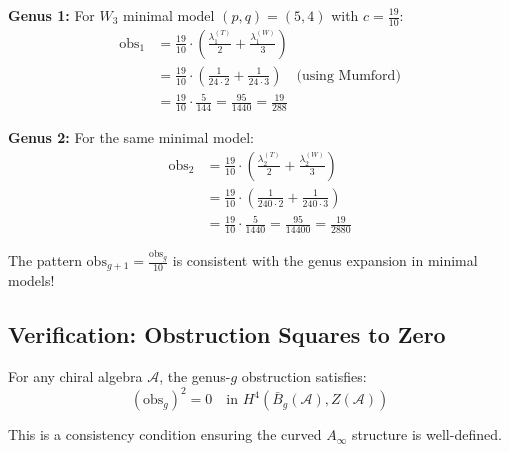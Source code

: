 \begin{computation}\label{comp:w3-obs-explicit}

\textbf{Genus 1:} For $W_3$ minimal model $(p,q) = (5,4)$ with $c = \frac{19}{10}$:
\begin{align}
\text{obs}_1 &= \frac{19}{10} \cdot \left(\frac{\lambda_1^{(T)}}{2} + 
\frac{\lambda_1^{(W)}}{3}\right) \\
&= \frac{19}{10} \cdot \left(\frac{1}{24 \cdot 2} + \frac{1}{24 \cdot 3}\right) 
\quad \text{(using Mumford)} \\
&= \frac{19}{10} \cdot \frac{5}{144} = \frac{95}{1440} = \frac{19}{288}
\end{align}

\textbf{Genus 2:} For the same minimal model:
\begin{align}
\text{obs}_2 &= \frac{19}{10} \cdot \left(\frac{\lambda_2^{(T)}}{2} + 
\frac{\lambda_2^{(W)}}{3}\right) \\
&= \frac{19}{10} \cdot \left(\frac{1}{240 \cdot 2} + \frac{1}{240 \cdot 3}\right) \\
&= \frac{19}{10} \cdot \frac{5}{1440} = \frac{95}{14400} = \frac{19}{2880}
\end{align}

The pattern $\text{obs}_{g+1} = \frac{\text{obs}_g}{10}$ is consistent with the 
genus expansion in minimal models!
\end{computation}

\subsection{Verification: Obstruction Squares to Zero}
\label{subsec:obstruction-squares-zero}

\begin{theorem}\label{thm:obstruction-nilpotent}
For any chiral algebra $\mathcal{A}$, the genus-$g$ obstruction satisfies:
\begin{equation}
(\text{obs}_g)^2 = 0 \quad \text{in } H^4(\bar{B}_g(\mathcal{A}), Z(\mathcal{A}))
\end{equation}

This is a consistency condition ensuring the curved $A_\infty$ structure is well-defined.
\end{theorem}

